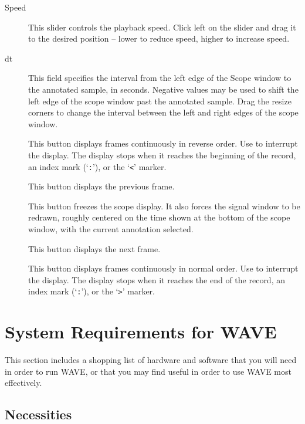 \documentclass[twoside]{book}
\newcommand{\button}[1]{\cornersize{2}\ovalbox{\rule[-.3mm]{0cm}{2.5mm}\small\sf ~#1~}}
\newcommand{\WAVE}{{\sf WAVE}\xspace}
\begin{document}
\begin{description}
\item[{\sf Speed}]
This slider controls the playback speed.  Click left on the slider and drag it
to the desired position -- lower to reduce speed, higher to increase speed.

\item[{\sf dt}]
This field specifies the interval from the left edge of the {\sf Scope} window
to the annotated sample, in seconds.  Negative values may be used to shift the
left edge of the scope window past the annotated sample.  Drag the resize
corners to change the interval between the left and right edges of the scope
window.

\item[\button{\tt <<}]
This button displays frames continuously in reverse order.  Use \button{Pause}
to interrupt the display.  The display stops when it reaches the
beginning of the record, an index mark (`{\tt :}'), or the `{\tt <}' marker.

\item[\button{\tt <}]
This button displays the previous frame.

\item[\button{Pause}]
This button freezes the scope display.  It also forces the signal window to be
redrawn, roughly centered on the time shown at the bottom of the scope window,
with the current annotation selected.

\item[\button{\tt >}]
This button displays the next frame.

\item[\button{\tt >>}]
This button displays frames continuously in normal order.  Use \button{Pause}
to interrupt the display.  The display stops when it reaches the end of
the record, an index mark (`{\tt :}'), or the `{\tt >}' marker.
\end{description}

\chapter{System Requirements for \WAVE{}}

\label{app:system-requirements}
This section includes a shopping list of hardware and software that you will
need in order to run \WAVE{}, or that you may find useful in order to use
\WAVE{} most effectively.

\section{Necessities}
\end{document}
